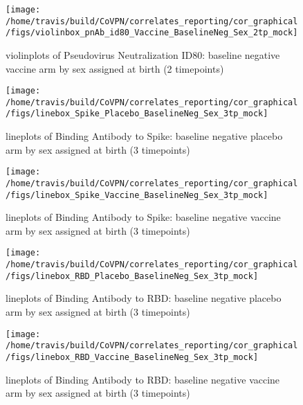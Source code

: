 \documentclass[]{book}
\theoremstyle{definition}
\theoremstyle{definition}
\theoremstyle{definition}
\newcommand{\1}{\mathbbm{1}}
\begin{document}
\clearpage
\begin{figure}[H]

{\centering \texttt{[image: /home/travis/build/CoVPN/correlates\_reporting/cor\_graphical/figs/violinbox\_pnAb\_id80\_Vaccine\_BaselineNeg\_Sex\_2tp\_mock]} 

}

\caption{violinplots of Pseudovirus Neutralization ID80: baseline negative vaccine arm by sex assigned at birth (2 timepoints)}\label{fig:unnamed-chunk-170}
\end{figure}

\clearpage
\begin{figure}[H]

{\centering \texttt{[image: /home/travis/build/CoVPN/correlates\_reporting/cor\_graphical/figs/linebox\_Spike\_Placebo\_BaselineNeg\_Sex\_3tp\_mock]} 

}

\caption{lineplots of Binding Antibody to Spike: baseline negative placebo arm by sex assigned at birth (3 timepoints)}\label{fig:unnamed-chunk-171}
\end{figure}

\clearpage
\begin{figure}[H]

{\centering \texttt{[image: /home/travis/build/CoVPN/correlates\_reporting/cor\_graphical/figs/linebox\_Spike\_Vaccine\_BaselineNeg\_Sex\_3tp\_mock]} 

}

\caption{lineplots of Binding Antibody to Spike: baseline negative vaccine arm by sex assigned at birth (3 timepoints)}\label{fig:unnamed-chunk-172}
\end{figure}

\clearpage
\begin{figure}[H]

{\centering \texttt{[image: /home/travis/build/CoVPN/correlates\_reporting/cor\_graphical/figs/linebox\_RBD\_Placebo\_BaselineNeg\_Sex\_3tp\_mock]} 

}

\caption{lineplots of Binding Antibody to RBD: baseline negative placebo arm by sex assigned at birth (3 timepoints)}\label{fig:unnamed-chunk-173}
\end{figure}

\clearpage
\begin{figure}[H]

{\centering \texttt{[image: /home/travis/build/CoVPN/correlates\_reporting/cor\_graphical/figs/linebox\_RBD\_Vaccine\_BaselineNeg\_Sex\_3tp\_mock]} 

}

\caption{lineplots of Binding Antibody to RBD: baseline negative vaccine arm by sex assigned at birth (3 timepoints)}\label{fig:unnamed-chunk-174}
\end{figure}
\end{document}
